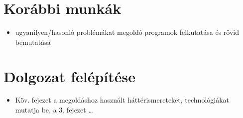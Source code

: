 \section{Korábbi munkák}
\begin{itemize}
  \item ugyanilyen/hasonló problémákat megoldó programok felkutatása és rövid bemutatása
\end{itemize}
\section{Dolgozat felépítése}
\begin{itemize}
  \item Köv. fejezet a megoldáshoz használt háttérismereteket, technológiákat mutatja be, a 3. fejezet \ldots
\end{itemize}